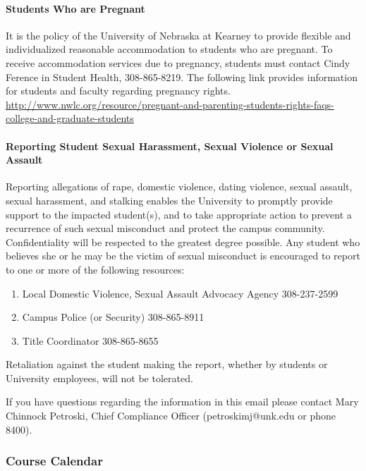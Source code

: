 \documentclass[12pt]{article}
\newcounter{ex}\setcounter{ex}{0}
\newcounter{dy}\setcounter{dy}{0}
\newcounter{cy}\setcounter{cy}{\the\year}
\newcommand{\RNum}[1]{\uppercase\expandafter{\romannumeral #1\relax}}
\begin{document}
\paragraph{Students Who are Pregnant} It is the policy of the University of Nebraska at Kearney to provide flexible and individualized reasonable accommodation to students who are pregnant. To receive accommodation services due to pregnancy, students must contact Cindy Ference in Student Health, 308-865-8219. The following link provides information for students and faculty regarding pregnancy rights. \url{http://www.nwlc.org/resource/pregnant-and-parenting-students-rights-faqs-college-and-graduate-students}



\paragraph{Reporting Student Sexual Harassment, Sexual Violence or Sexual Assault} Reporting allegations of rape, domestic violence, dating violence, sexual assault, sexual harassment, and stalking enables the University to promptly provide support to the impacted student(s), and to take appropriate action to prevent a recurrence of such sexual misconduct and protect the campus community. Confidentiality will be respected to the greatest degree possible. Any student who believes she or he may be the victim of sexual misconduct is encouraged to report to one or more of the following resources:

\begin{enumerate}

\item Local Domestic Violence, Sexual Assault Advocacy Agency 308-237-2599

\item Campus Police (or Security) 308-865-8911

\item Title \RNum{9}  Coordinator 308-865-8655

\end{enumerate}
Retaliation against the student making the report, whether by students or University employees, will not be tolerated.


If you have questions regarding the information in this email please contact Mary Chinnock Petroski, Chief Compliance Officer (petroskimj@unk.edu or phone 8400).




\newpage


\subsubsection*{Course Calendar}
\end{document}
